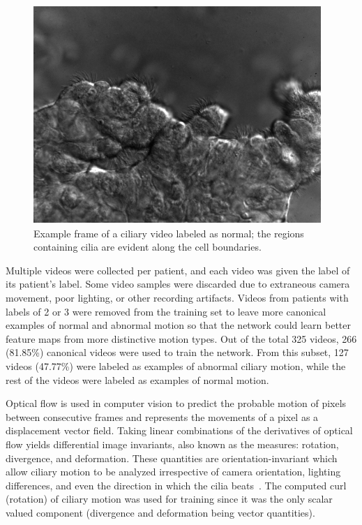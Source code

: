 \begin{figure}
\includegraphics[scale=0.78]{grey_1011-5_heathly}
\caption{Example frame of a ciliary video labeled as normal; the regions containing cilia are evident along the cell boundaries.}
\label{fig:cilia}
\end{figure}

Multiple videos were collected per patient, and each video was given the label of its patient's label. Some video samples were discarded due to extraneous camera movement, poor lighting, or other recording artifacts. Videos from patients with labels of 2 or 3 were removed from the training set to leave more canonical examples of normal and abnormal motion so that the network could learn better feature maps from more distinctive motion types. Out of the total 325 videos, 266 (81.85\%) canonical videos were used to train the network. From this subset, 127 videos (47.77\%) were labeled as examples of abnormal ciliary motion, while the rest of the videos were labeled as examples of normal motion.
 
Optical flow is used in computer vision to predict the probable motion of pixels between consecutive frames and represents the movements of a pixel as a displacement vector field. Taking linear combinations of the derivatives of optical flow yields differential image invariants, also known as the measures: rotation, divergence, and deformation. These quantities are orientation-invariant which allow ciliary motion to be analyzed irrespective of camera orientation, lighting differences, and even the direction in which the cilia beats~\cite{quinn2015automated}. The computed curl (rotation) of ciliary motion was used for training since it was the only scalar valued component (divergence and deformation being vector quantities). 
 
